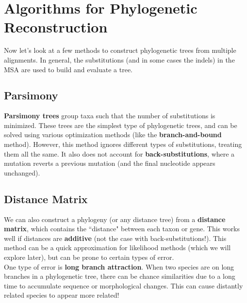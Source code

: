 \documentclass[12pt]{article}
\begin{document}
\section{Algorithms for Phylogenetic Reconstruction}
Now let's look at a few methods to construct phylogenetic trees from multiple alignments. In general, the substitutions (and in some cases the indels) in the MSA are used to build and evaluate a tree.
\subsection{Parsimony}
\textbf{Parsimony trees} group taxa such that the number of substitutions is minimized. These trees are the simplest type of phylogenetic trees, and can be solved using various optimization methods (like the \textbf{branch-and-bound} method). However, this method ignores different types of substitutions, treating them all the same. It also does not account for \textbf{back-substitutions}, where a mutation reverts a previous mutation (and the final nucleotide appears unchanged).
\subsection{Distance Matrix}
We can also construct a phylogeny (or any distance tree) from a \textbf{distance matrix}, which contains the ``distance" between each taxon or gene. This works well if distances are \textbf{additive} (not the case with back-substitutions!). This method can be a quick approximation for likelihood methods (which we will explore later), but can be prone to certain types of error.\\[10pt] One type of error is \textbf{long branch attraction}. When two species are on long branches in a phylogenetic tree, there can be chance similarities due to a long time to accumulate sequence or morphological changes. This can cause distantly related species to appear more related!
\end{document}
